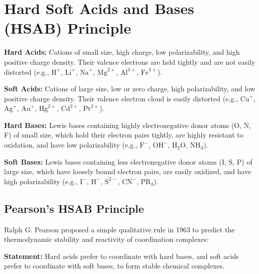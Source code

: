 \documentclass[12pt,a4paper]{article}
\begin{document}
\section{Hard Soft Acids and Bases (HSAB) Principle}

\begin{tcolorbox}[defbox, title={Definitions: Pearson's HSAB Classification}]
  \textbf{Hard Acids:} Cations of small size, high charge, low polarizability, and high positive charge density. Their valence electrons are held tightly and are not easily distorted (e.g., $\text{H}^+$, $\text{Li}^+$, $\text{Na}^+$, $\text{Mg}^{2+}$, $\text{Al}^{3+}$, $\text{Fe}^{3+}$).
  \par\vspace{4pt}
  \textbf{Soft Acids:} Cations of large size, low or zero charge, high polarizability, and low positive charge density. Their valence electron cloud is easily distorted (e.g., $\text{Cu}^+$, $\text{Ag}^+$, $\text{Au}^+$, $\text{Hg}^{2+}$, $\text{Cd}^{2+}$, $\text{Pt}^{2+}$).
  \par\vspace{4pt}
  \textbf{Hard Bases:} Lewis bases containing highly electronegative donor atoms (O, N, F) of small size, which hold their electron pairs tightly, are highly resistant to oxidation, and have low polarizability (e.g., $\text{F}^-$, $\text{OH}^-$, $\text{H}_2\text{O}$, $\text{NH}_3$).
  \par\vspace{4pt}
  \textbf{Soft Bases:} Lewis bases containing less electronegative donor atoms (I, S, P) of large size, which have loosely bound electron pairs, are easily oxidized, and have high polarizability (e.g., $\text{I}^-$, $\text{H}^-$, $\text{S}^{2-}$, $\text{CN}^-$, $\text{PR}_3$).
\end{tcolorbox}

\subsection{Pearson's HSAB Principle}
Ralph G. Pearson proposed a simple qualitative rule in 1963 to predict the thermodynamic stability and reactivity of coordination complexes:

\begin{tcolorbox}[formulabox, title={Pearson's HSAB Principle}]
  \textbf{Statement:} Hard acids prefer to coordinate with hard bases, and soft acids prefer to coordinate with soft bases, to form stable chemical complexes.
\end{tcolorbox}
\end{document}
